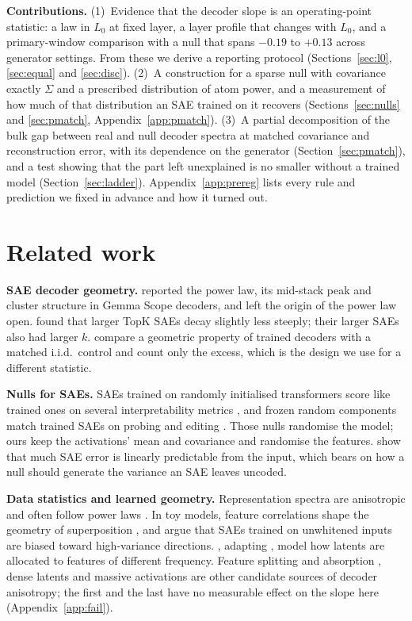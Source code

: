 \documentclass{article}
\newcommand{\Sig}{\Sigma}
\newcommand{\Lz}{L_0}
\begin{document}
\textbf{Contributions.}
(1)~Evidence that the decoder slope is an operating-point statistic: a law in $\Lz$ at fixed layer, a layer profile that changes with $\Lz$, and a primary-window comparison with a null that spans $-0.19$ to $+0.13$ across generator settings. From these we derive a reporting protocol (Sections~\ref{sec:l0}, \ref{sec:equal} and \ref{sec:disc}).
(2)~A construction for a sparse null with covariance exactly $\Sig$ and a prescribed distribution of atom power, and a measurement of how much of that distribution an SAE trained on it recovers (Sections~\ref{sec:nulls} and \ref{sec:pmatch}, Appendix~\ref{app:pmatch}).
(3)~A partial decomposition of the bulk gap between real and null decoder spectra at matched covariance and reconstruction error, with its dependence on the generator (Section~\ref{sec:pmatch}), and a test showing that the part left unexplained is no smaller without a trained model (Section~\ref{sec:ladder}).
Appendix~\ref{app:prereg} lists every rule and prediction we fixed in advance and how it turned out.

\section{Related work}

\textbf{SAE decoder geometry.} \citet{li2025geometry} reported the power law, its mid-stack peak and cluster structure in Gemma Scope decoders, and left the origin of the power law open. \citet{peter2025progressive} found that larger TopK SAEs decay slightly less steeply; their larger SAEs also had larger $k$. \citet{borobia2026nearfloor} compare a geometric property of trained decoders with a matched i.i.d.\ control and count only the excess, which is the design we use for a different statistic.

\textbf{Nulls for SAEs.} SAEs trained on randomly initialised transformers score like trained ones on several interpretability metrics \citep{heap2025random}, and frozen random components match trained SAEs on probing and editing \citep{korznikov2026sanity}. Those nulls randomise the model; ours keep the activations' mean and covariance and randomise the features. \citet{engels2025darkmatter} show that much SAE error is linearly predictable from the input, which bears on how a null should generate the variance an SAE leaves uncoded.

\textbf{Data statistics and learned geometry.} Representation spectra are anisotropic \citep{ethayarajh2019contextual} and often follow power laws \citep{ghosh2022powerlaws}. In toy models, feature correlations shape the geometry of superposition \citep{prieto2026correlations}, and \citet{saraswatula2025whitening} argue that SAEs trained on unwhitened inputs are biased toward high-variance directions. \citet{michaud2025manifolds}, adapting \citet{brill2024scaling}, model how latents are allocated to features of different frequency. Feature splitting and absorption \citep{chanin2025absorption}, dense latents \citep{sun2025dense} and massive activations \citep{sun2024massive} are other candidate sources of decoder anisotropy; the first and the last have no measurable effect on the slope here (Appendix~\ref{app:fail}).
\end{document}
